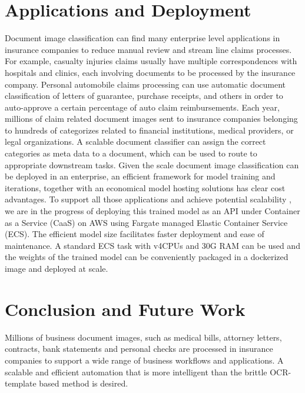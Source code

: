 \documentclass[letterpaper]{article}
\begin{document}
 \section{Applications and Deployment}
Document image classification can find many enterprise level applications in insurance companies to reduce manual review and stream line claims processes. For example, casualty injuries claims usually have multiple correspondences with hospitals and clinics, each involving documents to be processed by the insurance company. Personal automobile claims processing can use automatic document classification of letters of guarantee, purchase receipts, and others in order to auto-approve a certain percentage of auto claim reimbursements. Each year, millions of claim related document images sent to insurance companies belonging to hundreds of categorizes related to financial institutions, medical providers, or legal organizations. A scalable document classifier can assign the correct categories as meta data to a document, which can be used to route to appropriate downstream tasks. Given the scale document image classification can be deployed in an enterprise, 
an efficient framework for model training and iterations, together with an economical model hosting solutions has clear cost advantages.  
To support all those applications and achieve potential scalability , we are in the progress of deploying this trained model as an API under Container as a Service (CaaS) on AWS using Fargate managed Elastic Container Service (ECS). The efficient model size facilitates faster deployment and ease of maintenance. A standard ECS task with v4CPUs and 30G RAM can be used and the weights of the trained model can be conveniently packaged in a dockerized image and deployed at scale. 












 \section{Conclusion and Future Work}
Millions of business document images, such as medical bills, attorney letters, contracts, bank statements and personal checks are processed in insurance companies to support a wide range of business workflows and applications. A scalable and efficient automation that is more intelligent than the brittle OCR-template based method is desired. 
\end{document}
